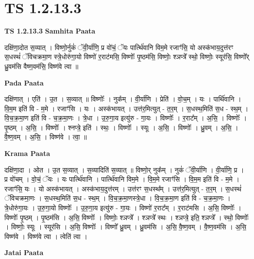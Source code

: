 \documentclass[17pt]{extarticle}
\begin{document}
\section*{ TS 1.2.13.3 }

\textbf{TS 1.2.13.3 } \newline
\textbf{Samhita Paata} \newline

दक्षि॑णा॒दोत स॒व्यात् । विष्णो॒र्नुकं॑ ॅवी॒र्या॑णि॒ प्र वो॑चं॒ ॅयः पार्त्थि॑वानि विम॒मे रजाꣳ॑सि॒ यो अस्क॑भाय॒दुत्त॑रꣳ स॒धस्थं॑ ॅविचक्रमा॒ण स्त्रे॒धोरु॑गा॒यो विष्णो॑ र॒राट॑मसि॒ विष्णोः᳚ पृ॒ष्ठम॑सि॒ विष्णोः॒ श्ञप्त्रे᳚ स्थो॒ विष्णोः॒ स्यूर॑सि॒ विष्णो᳚र् ध्रु॒वम॑सि वैष्ण॒वम॑सि॒ विष्ण॑वे त्वा ॥ \newline

\textbf{Pada Paata} \newline

दक्षि॑णात् । एति॑ । उ॒त । स॒व्यात् ॥ विष्णोः᳚ । नुक᳚म् । वी॒र्या॑णि । प्रेति॑ । वो॒च॒म् । यः । पार्थि॑वानि । वि॒म॒म इति॑ वि - म॒मे । रजाꣳ॑सि । यः । अस्क॑भायत् । उत्त॑र॒मित्युत् - त॒र॒म् । स॒धस्थ॒मिति॑ स॒ध - स्थ॒म् । वि॒च॒क्र॒मा॒ण इति॑ वि - च॒क्र॒मा॒णः । त्रे॒धा । उ॒रु॒गा॒य इत्यु॑रु - गा॒यः । विष्णोः᳚ । र॒राट᳚म् । अ॒सि॒ । विष्णोः᳚ । पृ॒ष्ठम् । अ॒सि॒ । विष्णोः᳚ । श्नप्त्रे॒ इति॑ । स्थः॒ । विष्णोः᳚ । स्यूः । अ॒सि॒ । विष्णोः᳚ । ध्रु॒वम् । अ॒सि॒ । वै॒ष्ण॒वम् । अ॒सि॒ । विष्ण॑वे । त्वा॒ ॥  \newline


\textbf{Krama Paata} \newline

दक्षि॑णा॒दा । ओत । उ॒त स॒व्यात् । स॒व्यादिति॑ स॒व्यात् ॥ विष्णो॒र् नुक᳚म् । नुकं॑ ॅवी॒र्या॑णि । वी॒र्या॑णि॒ प्र । प्र वो॑चम् । वो॒चं॒ ॅयः । यः पार्त्थि॑वानि । पार्त्थि॑वानि विम॒मे । वि॒म॒मे रजाꣳ॑सि । वि॒म॒म इति॑ वि - म॒मे । रजाꣳ॑सि॒ यः । यो अस्क॑भायत् । अस्क॑भाय॒दुत्त॑रम् । उत्त॑रꣳ स॒धस्थ᳚म् । उत्त॑र॒मित्युत् - त॒र॒म् । स॒धस्थं॑ ॅविचक्रमा॒णः । स॒धस्थ॒मिति॑ स॒ध - स्थ॒म् । वि॒च॒क्र॒मा॒णस्त्रे॒धा । वि॒च॒क्र॒मा॒ण इति॑ वि - च॒क्र॒मा॒णः । त्रे॒धोरु॑गा॒यः । उ॒रु॒गा॒यो विष्णोः᳚ । उ॒रु॒गा॒य इत्यु॑रु - गा॒यः । विष्णो॑ र॒राट᳚म् । र॒राट॑मसि । अ॒सि॒ विष्णोः᳚ । विष्णोः᳚ पृ॒ष्ठम् । पृ॒ष्ठम॑सि । अ॒सि॒ विष्णोः᳚ । विष्णोः॒ श्ञप्त्रे᳚ । श्ञप्त्रे᳚ स्थः । श्ञप्त्रे॒ इति॒ श्ञप्त्रे᳚ । स्थो॒ विष्णोः᳚ । विष्णोः॒ स्यूः । स्यूर॑सि । अ॒सि॒ विष्णोः᳚ । विष्णो᳚ ध्रु॒वम् । ध्रु॒वम॑सि । अ॒सि॒ वै॒ष्ण॒वम् । वै॒ष्ण॒वम॑सि । अ॒सि॒ विष्ण॑वे । विष्ण॑वे त्वा । त्वेति॑ त्वा । \newline

\textbf{Jatai Paata} \newline
\end{document}
